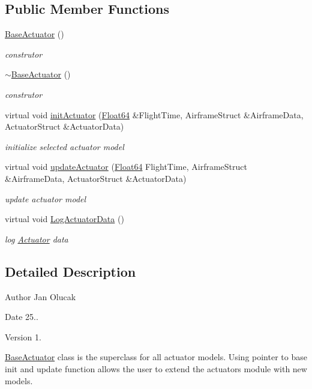 \subsection*{Public Member Functions}
\begin{DoxyCompactItemize}
\item 
\hyperlink{class_base_actuator_a2d0295f149b3db546762ae596d14c6d4}{Base\+Actuator} ()
\begin{DoxyCompactList}\small\item\em construtor \end{DoxyCompactList}\item 
\hyperlink{class_base_actuator_a7326269c65ea05ce4b6aa0333984bf56}{$\sim$\+Base\+Actuator} ()
\begin{DoxyCompactList}\small\item\em construtor \end{DoxyCompactList}\item 
virtual void \hyperlink{class_base_actuator_aa37ef0301610ceba649c25bdaa71fa87}{init\+Actuator} (\hyperlink{group___tools_ga3f1431cb9f76da10f59246d1d743dc2c}{Float64} \&Flight\+Time, Airframe\+Struct \&Airframe\+Data, Actuator\+Struct \&Actuator\+Data)
\begin{DoxyCompactList}\small\item\em initialize selected actuator model \end{DoxyCompactList}\item 
virtual void \hyperlink{class_base_actuator_a8aea3be414ce0dc3afd8e2a54bd523ae}{update\+Actuator} (\hyperlink{group___tools_ga3f1431cb9f76da10f59246d1d743dc2c}{Float64} Flight\+Time, Airframe\+Struct \&Airframe\+Data, Actuator\+Struct \&Actuator\+Data)
\begin{DoxyCompactList}\small\item\em update actuator model \end{DoxyCompactList}\item 
virtual void \hyperlink{class_base_actuator_a60e40bc448e4bea4e079263dd7d78770}{Log\+Actuator\+Data} ()
\begin{DoxyCompactList}\small\item\em log \hyperlink{class_actuator}{Actuator} data \end{DoxyCompactList}\end{DoxyCompactItemize}


\subsection{Detailed Description}
\begin{DoxyAuthor}{Author}
Jan Olucak 
\end{DoxyAuthor}
\begin{DoxyDate}{Date}
25.. 
\end{DoxyDate}
\begin{DoxyVersion}{Version}
1.
\end{DoxyVersion}
\hyperlink{class_base_actuator}{Base\+Actuator} class is the superclass for all actuator models. Using pointer to base init and update function allows the user to extend the actuators module with new models. 

